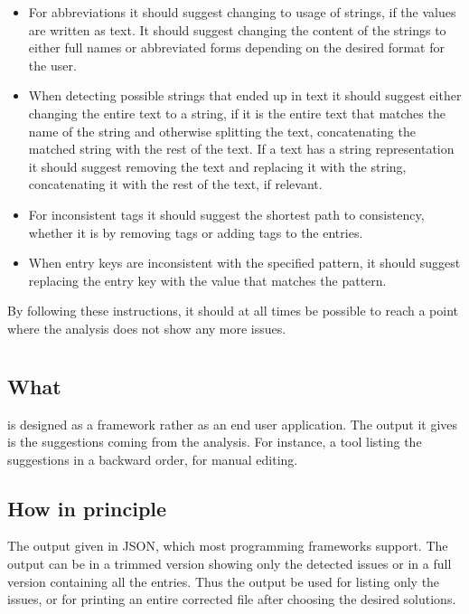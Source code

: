 \begin{itemize}
\item For abbreviations it should suggest changing to usage of
  strings, if the values are written as text.  It should suggest
  changing the content of the strings to either full names or
  abbreviated forms depending on the desired format for the user.

\item When detecting possible strings that ended up in text it should
  suggest either changing the entire text to a string, if it is the
  entire text that matches the name of the string and otherwise
  splitting the text, concatenating the matched string with the rest
  of the text.  If a text has a string representation it should
  suggest removing the text and replacing it with the string,
  concatenating it with the rest of the text, if relevant.

\item For inconsistent tags it should suggest the shortest path to
  consistency, whether it is by removing tags or adding tags to the
  entries.

\item When entry keys are inconsistent with the specified pattern, it
  should suggest replacing the entry key with the value that matches
  the pattern.
\end{itemize}

By following these instructions, it should at all times be possible to
reach a point where the analysis does not show any more issues.


\section{\orangutan}

\subsection{What}
\label{sec:organizing_orangutan_what}

{\orangutan} is designed as a framework rather as an end user
application.  The output it gives is the suggestions coming from the
analysis.  For instance, a tool listing the suggestions in a backward
order, for manual editing.


\subsection{How in principle}
\label{sec:organizing_orangutan_how_principle}

The output given in JSON, which most programming frameworks support.
The output can be in a trimmed version showing only the detected
issues or in a full version containing all the entries.  Thus the
output be used for listing only the issues, or for printing an entire
corrected {\bibtex} file after choosing the desired solutions.


